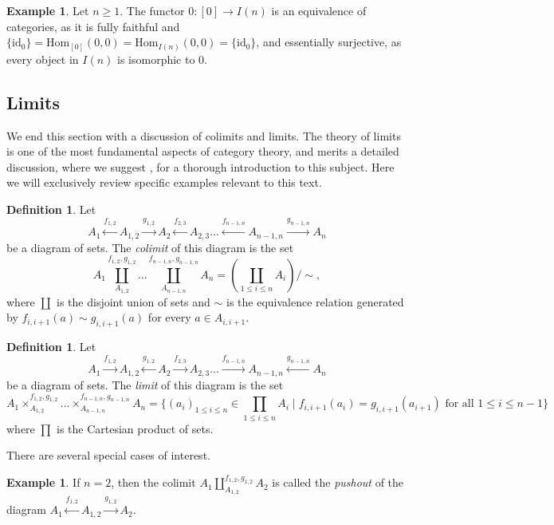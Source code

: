 \documentclass[11pt, a4paper]{amsart}
\newcommand{\Hom}{\mathrm{Hom}}
\newcommand{\id}{\mathrm{id}}
\theoremstyle{definition}
\newtheorem{definition}[equation]{Definition}
\newtheorem{example}[equation]{Example}
\theoremstyle{remark}
\numberwithin{equation}{section}
\begin{document}
\begin{example} \label{ex:i equivalence}
  Let $n \geq 1$. The functor $0\colon [0] \to I(n)$ is an equivalence of categories, as it is fully faithful and $\{\id_0\} = \Hom_{[0]}(0,0) = \Hom_{I(n)}(0,0) = \{\id_0\}$, and essentially surjective, as every object in $I(n)$ is isomorphic to $0$.
\end{example}

\subsection{Limits} \label{subsec:limits}
We end this section with a discussion of colimits and limits. The theory of limits is one of the most fundamental aspects of category theory, and merits a detailed discussion, where we suggest \cite[Section V]{maclane1998categories}, \cite[Chapter 3]{riehl2016context} for a thorough introduction to this subject. Here we will exclusively review specific examples relevant to this text.

\begin{definition} \label{def:colimit}
  Let 
  \[A_1 \xleftarrow{f_{1,2}} A_{1,2} \xrightarrow{g_{1,2}} A_2 \xleftarrow{f_{2,3}} A_{2,3} ... \xleftarrow{f_{n-1,n}} A_{n-1,n}\xrightarrow{g_{n-1,n}}  A_n \]
   be a diagram of sets. The \emph{colimit} of this diagram is the set 
  \[A_1 \coprod_{A_{1,2}}^{f_{1,2},g_{1,2}} ... \coprod_{A_{n-1,n}}^{f_{n-1,n},g_{n-1,n}} A_n = (\coprod_{1 \leq i \leq n}A_i) / \sim,\]
  where $\coprod$ is the disjoint union of sets and  $\sim$ is the equivalence relation generated by $f_{i,i+1}(a) \sim g_{i,i+1}(a)$ for every $a \in A_{i,i+1}$.
\end{definition}

\begin{definition} \label{def:limit}
  Let 
  \[A_1 \xrightarrow{f_{1,2}} A_{1,2} \xleftarrow{g_{1,2}} A_2 \xrightarrow{f_{2,3}} A_{2,3} ... \xrightarrow{f_{n-1,n}} A_{n-1,n}\xleftarrow{g_{n-1,n}}  A_n \]
   be a diagram of sets. The \emph{limit} of this diagram is the set 
   {\small
  \[A_1 \times_{A_{1,2}}^{f_{1,2},g_{1,2}} ... \times_{A_{n-1,n}}^{f_{n-1,n},g_{n-1,n}} A_n = \{(a_i)_{1 \leq i \leq n} \in \prod_{1 \leq i \leq n}A_i \mid f_{i,i+1}(a_i) = g_{i,i+1}(a_{i+1}) \text{ for all } 1 \leq i \leq n-1 \}\]
   }
  where $\prod$ is the Cartesian product of sets.
\end{definition}

There are several special cases of interest.

\begin{example} \label{ex:pushout}
 If $n = 2$, then the colimit $A_1 \coprod_{A_{1,2}}^{f_{1,2},g_{1,2}} A_2$ is called the \emph{pushout} of the diagram $A_1 \xleftarrow{f_{1,2}} A_{1,2} \xrightarrow{g_{1,2}} A_2$.  
\end{example}
\end{document}
